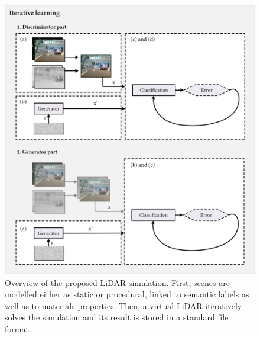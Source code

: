 \begin{figure}
    \centering
    \includegraphics[width=\linewidth]{figs/conclusions/gan.png}
    \caption{Overview of the proposed LiDAR simulation. First, scenes are modelled either as static or procedural, linked to semantic labels as well as to materials properties. Then, a virtual LiDAR iteratively solves the simulation and its result is stored in a standard file format.}
    \label{fig:conclusions_gan}
\end{figure}